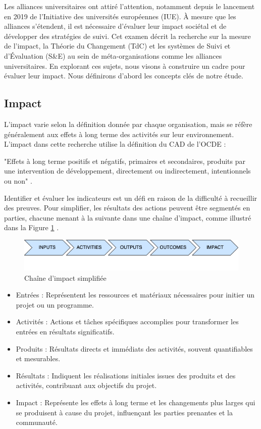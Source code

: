 Les alliances universitaires ont attiré l'attention, notamment depuis le lancement en 2019 de l'Initiative des universités européennes (IUE). À mesure que les alliances s'étendent, il est nécessaire d'évaluer leur impact sociétal et de développer des stratégies de suivi. Cet examen décrit la recherche sur la mesure de l'impact, la Théorie du Changement (TdC) et les systèmes de Suivi et d'Évaluation (S\&E) au sein de méta-organisations comme les alliances universitaires. En explorant ces sujets, nous visons à construire un cadre pour évaluer leur impact. Nous définirons d'abord les concepts clés de notre étude.

\subsection{Impact}
L'impact varie selon la définition donnée par chaque organisation, mais se réfère généralement aux effets à long terme des activités sur leur environnement. L'impact dans cette recherche utilise la définition du CAD de l'OCDE : 

"Effets à long terme positifs et négatifs, primaires et secondaires, produits par une intervention de développement, directement ou indirectement, intentionnels ou non" \cite{oecd_quality_2010}.

Identifier et évaluer les indicateurs est un défi en raison de la difficulté à recueillir des preuves. Pour simplifier, les résultats des actions peuvent être segmentés en parties, chacune menant à la suivante dans une chaîne d'impact, comme illustré dans la Figure \ref{fig:simplified-impact-chain} \cite{stein_understanding_2012}.
\begin{figure} [h]
    \centering 
    \includegraphics[width=1\linewidth]{images/Diagrams-IMPACT.png} 
    \caption{Chaîne d'impact simplifiée\cite{peersman_when_2016}}
    \label{fig:simplified-impact-chain} 
\end{figure}

\begin{itemize} 
    \item Entrées : Représentent les ressources et matériaux nécessaires pour initier un projet ou un programme. 
    \item Activités : Actions et tâches spécifiques accomplies pour transformer les entrées en résultats significatifs. 
    \item Produits : Résultats directs et immédiats des activités, souvent quantifiables et mesurables. 
    \item Résultats : Indiquent les réalisations initiales issues des produits et des activités, contribuant aux objectifs du projet. 
    \item Impact : Représente les effets à long terme et les changements plus larges qui se produisent à cause du projet, influençant les parties prenantes et la communauté. 
\end{itemize}

